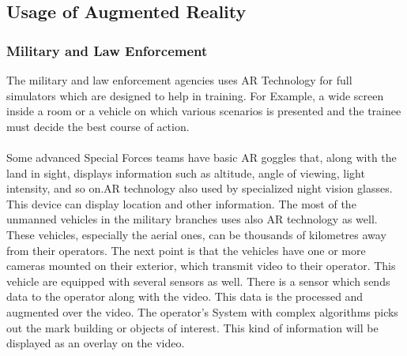  \subsection{Usage of Augmented Reality}
 \subsubsection{Military and Law Enforcement }
 The military and law enforcement agencies uses  AR Technology for  full simulators which are designed to help in training.  For Example, a wide screen inside a room or a vehicle on which various scenarios is presented and the trainee must decide the best course of action.
 \\
 \\
 Some advanced Special Forces teams have basic AR goggles that, along with the land in sight, displays information such as altitude, angle of viewing, light intensity, and so on.AR technology also used by specialized night vision glasses. This device can display location and other information. The most of the unmanned vehicles in the military branches uses also AR technology as well. These vehicles, especially the aerial ones, can be thousands of kilometres away from their operators. The next point is that the vehicles have one or more cameras mounted on their exterior, which transmit video to their operator. This vehicle are equipped with several sensors as well. There is a sensor which sends data to the operator along with the video. This data is the processed and augmented over the video.  The operator's System with complex algorithms picks out the mark building or objects of interest. This kind of information will be displayed as an overlay on the video.\cite{AugmentedBook}
 \\
 \\
